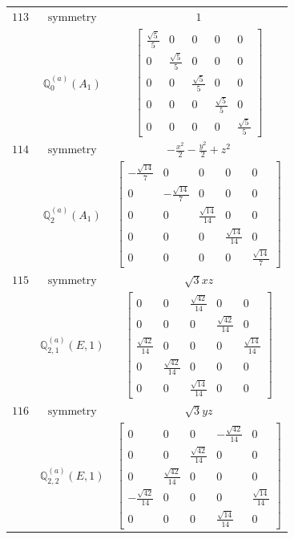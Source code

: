 \documentclass[fleqn,8pt,landscape]{jsarticle}
\begin{document}
\begin{longtable}{ccc}
$ 113 $ & $ \text{symmetry} $ & $ 1 $ \\
$  $ & $ \mathbb{Q}_{0}^{(a)}(A_{1}) $ & $ \begin{bmatrix} \frac{\sqrt{5}}{5} & 0 & 0 & 0 & 0 \\ 0 & \frac{\sqrt{5}}{5} & 0 & 0 & 0 \\ 0 & 0 & \frac{\sqrt{5}}{5} & 0 & 0 \\ 0 & 0 & 0 & \frac{\sqrt{5}}{5} & 0 \\ 0 & 0 & 0 & 0 & \frac{\sqrt{5}}{5} \end{bmatrix} $ \\ \hline
$ 114 $ & $ \text{symmetry} $ & $ - \frac{x^{2}}{2} - \frac{y^{2}}{2} + z^{2} $ \\
$  $ & $ \mathbb{Q}_{2}^{(a)}(A_{1}) $ & $ \begin{bmatrix} - \frac{\sqrt{14}}{7} & 0 & 0 & 0 & 0 \\ 0 & - \frac{\sqrt{14}}{7} & 0 & 0 & 0 \\ 0 & 0 & \frac{\sqrt{14}}{14} & 0 & 0 \\ 0 & 0 & 0 & \frac{\sqrt{14}}{14} & 0 \\ 0 & 0 & 0 & 0 & \frac{\sqrt{14}}{7} \end{bmatrix} $ \\ \hline
$ 115 $ & $ \text{symmetry} $ & $ \sqrt{3} x z $ \\
$  $ & $ \mathbb{Q}_{2,1}^{(a)}(E,1) $ & $ \begin{bmatrix} 0 & 0 & \frac{\sqrt{42}}{14} & 0 & 0 \\ 0 & 0 & 0 & \frac{\sqrt{42}}{14} & 0 \\ \frac{\sqrt{42}}{14} & 0 & 0 & 0 & \frac{\sqrt{14}}{14} \\ 0 & \frac{\sqrt{42}}{14} & 0 & 0 & 0 \\ 0 & 0 & \frac{\sqrt{14}}{14} & 0 & 0 \end{bmatrix} $ \\ \hline
$ 116 $ & $ \text{symmetry} $ & $ \sqrt{3} y z $ \\
$  $ & $ \mathbb{Q}_{2,2}^{(a)}(E,1) $ & $ \begin{bmatrix} 0 & 0 & 0 & - \frac{\sqrt{42}}{14} & 0 \\ 0 & 0 & \frac{\sqrt{42}}{14} & 0 & 0 \\ 0 & \frac{\sqrt{42}}{14} & 0 & 0 & 0 \\ - \frac{\sqrt{42}}{14} & 0 & 0 & 0 & \frac{\sqrt{14}}{14} \\ 0 & 0 & 0 & \frac{\sqrt{14}}{14} & 0 \end{bmatrix} $ \\ \hline

\end{longtable}
\end{document}
